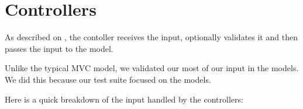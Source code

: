 \documentclass[letterpaper,10pt,english]{sphinxmanual}
\begin{document}
\chapter{Controllers}
\label{\detokenize{tiger_leagues/readme:controllers}}\label{\detokenize{tiger_leagues/readme:tiger-leagues-controllers}}\label{\detokenize{tiger_leagues/readme::doc}}
As described on ,
the contoller receives the input, optionally validates it and then passes
the input to the model.

Unlike the typical MVC model, we validated our most of our input in the models.
We did this because our test suite focused on the models.

Here is a quick breakdown of the input handled by the controllers:
\end{document}
